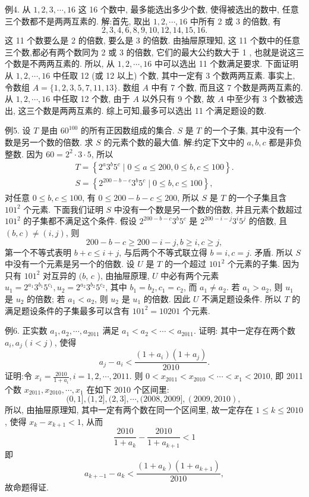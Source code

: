 例4. 从 $1,2,3, \cdots, 16$ 这 16 个数中, 最多能选出多少个数, 使得被选出的数中, 任意三个数都不是两两互素的.
解:首先, 取出 $1,2, \cdots, 16$ 中所有 2 或 3 的倍数, 有
$$
2,3,4,6,8,9,10,12,14,15,16 .
$$
这 11 个数要么是 2 的倍数, 要么是 3 的倍数.
由抽屉原理知, 这 11 个数中的任意三个数,都必有两个数同为 2 或 3 的倍数, 它们的最大公约数大于 1 , 也就是说这三个数是不两两互素的.
所以, 从 $1,2, \cdots, 16$ 中可以选出 11
个数满足要求.
下面证明从 $1,2, \cdots, 16$ 中任取 12 (或 12 以上) 个数, 其中一定有 3 个数两两互素.
事实上, 令数组 $A=\{1,2,3,5,7,11,13\}$. 数组 $A$ 中有 7 个数, 而且这 7 个数是两两互素的.
从 $1,2, \cdots, 16$ 中任取 12 个数, 由于 $A$ 以外只有 9 个数, 故 $A$ 中至少有 3 个数被选出, 这三个数是两两互素的.
综上可知,最多可以选出 11 个满足题设的数.



例5. 设 $T$ 是由 $60^{100}$ 的所有正因数组成的集合.
$S$ 是 $T$ 的一个子集, 其中没有一个数是另一个数的倍数.
求 $S$ 的元素个数的最大值.
解:约定下文中的 $a, b, c$ 都是非负整数.
因为 $60=2^2 \cdot 3 \cdot 5$, 所以
$$
\begin{gathered}
T=\left\{2^a 3^b 5^c \mid 0 \leqslant a \leqslant 200,0 \leqslant b, c \leqslant 100\right\} . \\
S=\left\{2^{200-b-c} 3^b 5^c \mid 0 \leqslant b, c \leqslant 100\right\},
\end{gathered}
$$
对任意 $0 \leqslant b, c \leqslant 100$, 有 $0 \leqslant 200-b-c \leqslant 200$, 所以 $S$ 是 $T$ 的一个子集且含 $101^2$ 个元素.
下面我们证明 $S$ 中没有一个数是另一个数的倍数, 并且元素个数超过 $101^2$ 的子集都不满足这个条件.
假设 $2^{200-b-c} 3^b 5^c$ 是 $2^{200-i-j} 3^i 5^j$ 的倍数, 且 $(b, c) \neq(i, j)$, 则
$$
200-b-c \geqslant 200-i-j, b \geqslant i, c \geqslant j,
$$
第一个不等式表明 $b+c \leqslant i+j$, 与后两个不等式联立得 $b=i, c=j$. 矛盾.
所以 $S$ 中没有一个元素是另一个的倍数.
设 $U$ 是 $T$ 的一个超过 $101^2$ 个元素的子集.
因为只有 $101^2$ 对互异的 $(b$, $c$ ), 由抽屉原理, $U$ 中必有两个元素 $u_1=2^{a_1} 3^{b_1} 5^{c_1}, u_2=2^{a_2} 3^{b_2} 5^{c_2}$, 其中 $b_1= b_2, c_1=c_2$, 而 $a_1 \neq a_2$. 若 $a_1>a_2$, 则 $u_1$ 是 $u_2$ 的倍数; 若 $a_1<a_2$, 则 $u_2$ 是 $u_1$ 的倍数.
因此 $U$ 不满足题设条件.
所以 $T$ 的满足题设条件的子集最多可以含有 $101^2=10201$ 个元素.



例6. 正实数 $a_1, a_2, \cdots, a_{2011}$ 满足 $a_1<a_2<\cdots<a_{2011}$. 证明: 其中一定存在两个数 $a_i, a_j(i<j)$, 使得
$$
a_j-a_i<\frac{\left(1+a_i\right)\left(1+a_j\right)}{2010} .
$$
证明:令 $x_i=\frac{2010}{1+a_i}, i=1,2, \cdots, 2011$. 则 $0<x_{2011}<x_{2010}<\cdots< x_1<2010$, 即 2011 个数 $x_{2011}, x_{2010}, \cdots, x_1$ 在如下 2010 个区间里:
$$
(0,1],(1,2],(2,3], \cdots,(2008,2009],(2009,2010) \text {, }
$$
所以, 由抽屉原理知, 其中一定有两个数在同一个区间里, 故一定存在 $1 \leqslant k \leqslant 2010$, 使得 $x_k-x_{k+1}<1$, 从而
$$
\frac{2010}{1+a_k}-\frac{2010}{1+a_{k+1}}<1
$$
即
$$
a_{k+-1}-a_k<\frac{\left(1+a_k\right)\left(1+a_{k+1}\right)}{2010},
$$
故命题得证.



